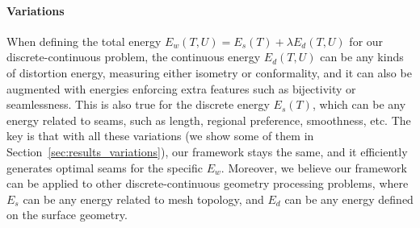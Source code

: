 \paragraph{Variations}

When defining the total energy $E_w(T,U) = E_s(T) + \lambda E_d(T,U)$ for our discrete-continuous problem, the continuous energy $E_d(T,U)$ can be any kinds of distortion energy, measuring either isometry or conformality, and it can also be augmented with energies enforcing extra features such as bijectivity or seamlessness. This is also true for the discrete energy $E_s(T)$, which can be any energy related to seams, such as length, regional preference, smoothness, etc. The key is that with all these variations (we show some of them in Section~\ref{sec:results_variations}), our framework stays the same, and it efficiently generates optimal seams for the specific $E_w$. Moreover, we believe our framework can be applied to other discrete-continuous geometry processing problems, where $E_s$ can be any energy related to mesh topology, and $E_d$ can be any energy defined on the surface geometry.
